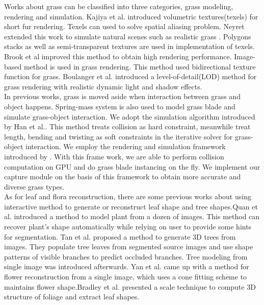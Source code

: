 \documentclass[10pt,journal,compsoc]{IEEEtran}
\begin{document}
Works about grass can be classified into three categories, grass modeling, rendering and simulation.  Kajiya et al.\cite{kajiya1989rendering} introduced volumetric textures(texels) for short fur rendering. Texels can used to solve spatial aliasing problem. Neyret extended this work to simulate natural scenes such as realistic grass\cite{neyret1996synthesizing} \cite{neyret1998modeling}. Polygons stacks as well as semi-transparent textures are used in implementation of texels\cite{meyer1998interactive}. Brook et al\cite{bakay2002real} improved this method to obtain high rendering performance. Image-based method is used in grass rendering\cite{shah2005real}. This method used bidirectional texture function for grass. Boulanger et al.\cite{boulanger2009rendering} introduced a level-of-detail(LOD) method for grass rendering with realistic dynamic light and shadow effects.\\

In previous works, grass is moved aside when interaction between grass and object happens\cite{guerraz2003procedural}. Spring-mass system is also used to model grass blade and simulate grass-object interaction\cite{chen2010real}\cite{hempe2013generation}. We adopt the simulation algorithm introduced by Han et al.\cite{han2012real}. This method treats collision as hard constraint, meanwhile treat length, bending and twisting as soft constraints in the iterative solver for grass-object interaction. We employ the rendering and simulation framework introduced by \cite{fan2015simulation}. With this frame work, we are able to perform collision computation on GPU and do grass blade instancing on the fly.  We implement our capture module on the basis of this framework to obtain more accurate and diverse grass types.\\

As for leaf and flora reconstruction, there are some previous works about using interactive method to generate or reconstruct leaf shape and tree shapes\cite{mundermann2003modeling}\cite{okabe2005interactive}\cite{anastacio2006modeling}\cite{chen2008sketch}\cite{pirk2012plastic}.Quan et al.\cite{quan2006image} introduced a method to model plant from a dozen of images. This method can recover plant's shape automatically while relying on user to provide some hints for segmentation. Tan et al.\cite{tan2007image} proposed a method to generate 3D trees from images. They populate tree leaves from segmented source images and use shape patterns of visible branches to predict occluded branches. Tree modeling from single image was introduced afterwards\cite{tan2008single}. Yan et al.\cite{yan2014flower} came up with a method for flower reconstruction from a single image, which uses a cone fitting scheme to maintains flower shape.Bradley et al.\cite{bradley2013image} presented a scale technique to compute 3D structure of foliage and extract leaf shapes.
\end{document}
